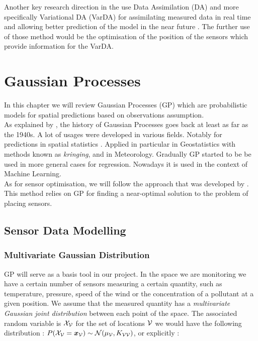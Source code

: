 \documentclass[12pt,twoside]{report}
\begin{document}
Another key research direction in the use Data Assimilation (DA) and more specifically Variational DA (VarDA) for assimilating measured data in real time and allowing better prediction of the model in the near future \citep{arcucci_effective_2018}. The further use of those method would be the optimisation of the position of the sensors which provide information for the VarDA.


\section{Gaussian Processes}

In this chapter we will review Gaussian Processes (GP) which are probabilistic models for spatial predictions based on observations assumption. \\ 

As explained by \citet[p.~29]{rasmussen_gaussian_2006}, the history of Gaussian Processes goes back at least as far as the 1940s. A lot of usages were developed in various fields. Notably for predictions in spatial statistics \citep{cressie_statistics_1991}.  Applied in particular in Geostatistics with methods known as \textit{kringing}, and in Meteorology. Gradually GP started to be be used in more general cases for regression. Nowadays it is used in the context of Machine Learning. \\

As for sensor optimisation, we will follow the approach that was developed by \citet{krause_near-optimal_2008}. This method relies on GP for finding a near-optimal solution to the problem of placing sensors. 


\subsection{Sensor Data Modelling}

\subsubsection{Multivariate Gaussian Distribution}

GP will serve as a basis tool in our project. In the space we are monitoring we have a certain number of sensors measuring a certain quantity, such as temperature, pressure, speed of the wind or the concentration of a pollutant at a given position. We assume that the measured quantity  has a \textit{multivariate Gaussian joint distribution} between each point of the space. The associated random variable is $\mathcal{X}_{\mathcal{V}}$ for the set of locations $\mathcal{V}$ we would have the following distribution : $P(\mathcal{X}_{\mathcal{V}} = {\boldsymbol{{x}}}_{\mathcal{V}}) \sim \mathcal{N}(\mu_{\mathcal{V}}, K_{\mathcal{V}\mathcal{V}}) $, or explicitly : 
\end{document}
